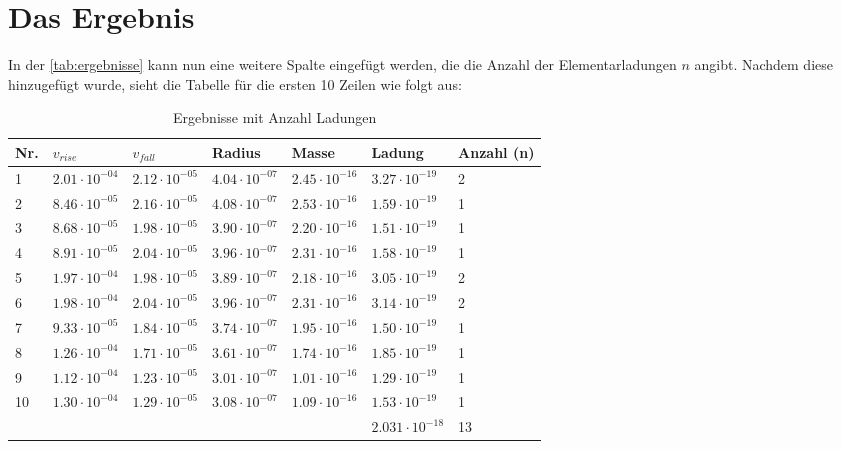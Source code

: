 \section{Das Ergebnis}\label{sec:ergebnis}
In der \autoref{tab:ergebnisse} kann nun eine weitere Spalte eingefügt werden, die die Anzahl der Elementarladungen $n$ angibt. Nachdem diese hinzugefügt wurde, sieht die Tabelle für die ersten 10 Zeilen wie folgt aus:

\begin{table}[H]
	\centering
	\begin{tabular}{llllll|l}
		\toprule
		Nr. & $v_{rise}$ & $v_{fall}$ & Radius & Masse & Ladung & Anzahl (n) \\
		\midrule
		1 &$\mathrm{2.01 \cdot 10^{-04}}$ & $\mathrm{2.12 \cdot 10^{-05}}$ & $\mathrm{4.04 \cdot 10^{-07}}$ & $\mathrm{2.45 \cdot 10^{-16}}$ & $\mathrm{3.27 \cdot 10^{-19}}$ & 2\\
		2 &$\mathrm{8.46 \cdot 10^{-05}}$ & $\mathrm{2.16 \cdot 10^{-05}}$ & $\mathrm{4.08 \cdot 10^{-07}}$ & $\mathrm{2.53 \cdot 10^{-16}}$ & $\mathrm{1.59 \cdot 10^{-19}}$ & 1\\
		3 &$\mathrm{8.68 \cdot 10^{-05}}$ & $\mathrm{1.98 \cdot 10^{-05}}$ & $\mathrm{3.90 \cdot 10^{-07}}$ & $\mathrm{2.20 \cdot 10^{-16}}$ & $\mathrm{1.51 \cdot 10^{-19}}$ & 1\\
		4 &$\mathrm{8.91 \cdot 10^{-05}}$ & $\mathrm{2.04 \cdot 10^{-05}}$ & $\mathrm{3.96 \cdot 10^{-07}}$ & $\mathrm{2.31 \cdot 10^{-16}}$ & $\mathrm{1.58 \cdot 10^{-19}}$ & 1\\
		5 &$\mathrm{1.97 \cdot 10^{-04}}$ & $\mathrm{1.98 \cdot 10^{-05}}$ & $\mathrm{3.89 \cdot 10^{-07}}$ & $\mathrm{2.18 \cdot 10^{-16}}$ & $\mathrm{3.05 \cdot 10^{-19}}$ & 2\\
		6 &$\mathrm{1.98 \cdot 10^{-04}}$ & $\mathrm{2.04 \cdot 10^{-05}}$ & $\mathrm{3.96 \cdot 10^{-07}}$ & $\mathrm{2.31 \cdot 10^{-16}}$ & $\mathrm{3.14 \cdot 10^{-19}}$ & 2\\
		7 &$\mathrm{9.33 \cdot 10^{-05}}$ & $\mathrm{1.84 \cdot 10^{-05}}$ & $\mathrm{3.74 \cdot 10^{-07}}$ & $\mathrm{1.95 \cdot 10^{-16}}$ & $\mathrm{1.50 \cdot 10^{-19}}$ & 1\\
		8 &$\mathrm{1.26 \cdot 10^{-04}}$ & $\mathrm{1.71 \cdot 10^{-05}}$ & $\mathrm{3.61 \cdot 10^{-07}}$ & $\mathrm{1.74 \cdot 10^{-16}}$ & $\mathrm{1.85 \cdot 10^{-19}}$ & 1\\
		9 &$\mathrm{1.12 \cdot 10^{-04}}$ & $\mathrm{1.23 \cdot 10^{-05}}$ & $\mathrm{3.01 \cdot 10^{-07}}$ & $\mathrm{1.01 \cdot 10^{-16}}$ & $\mathrm{1.29 \cdot 10^{-19}}$ & 1\\
		10 &$\mathrm{1.30 \cdot 10^{-04}}$ & $\mathrm{1.29 \cdot 10^{-05}}$ & $\mathrm{3.08 \cdot 10^{-07}}$ & $\mathrm{1.09 \cdot 10^{-16}}$ & $\mathrm{1.53 \cdot 10^{-19}}$ & 1\\
		\bottomrule
		&&&&& $2.031 \cdot 10^{-18}$ & 13 \\
	\end{tabular}
	\caption{Ergebnisse mit Anzahl Ladungen}
	\label{tab:anzahlLadung}
\end{table}
